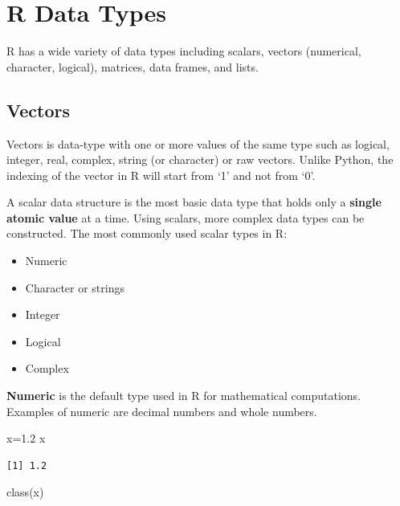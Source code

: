 \documentclass[
  letterpaper,
  DIV=11,
  numbers=noendperiod]{scrreprt}
\newenvironment{Shaded}{\begin{snugshade}}{\end{snugshade}}
\newcommand{\FloatTok}[1]{\textcolor[rgb]{0.68,0.00,0.00}{#1}}
\newcommand{\FunctionTok}[1]{\textcolor[rgb]{0.28,0.35,0.67}{#1}}
\newcommand{\NormalTok}[1]{\textcolor[rgb]{0.00,0.23,0.31}{#1}}
\newcommand{\OtherTok}[1]{\textcolor[rgb]{0.00,0.23,0.31}{#1}}
\begin{document}
\hypertarget{r-data-types}{%
\section{R Data Types}\label{r-data-types}}

R has a wide variety of data types including scalars, vectors
(numerical, character, logical), matrices, data frames, and lists.

\hypertarget{vectors}{%
\subsection{Vectors}\label{vectors}}

Vectors is data-type with one or more values of the same type such as
logical, integer, real, complex, string (or character) or raw vectors.
Unlike Python, the indexing of the vector in R will start from `1' and
not from `0'.

A scalar data structure is the most basic data type that holds only a
\textbf{single atomic value} at a time. Using scalars, more complex data
types can be constructed. The most commonly used scalar types in R:

\begin{itemize}
\item
  Numeric
\item
  Character or strings
\item
  Integer
\item
  Logical
\item
  Complex
\end{itemize}

\textbf{Numeric} is the default type used in R for mathematical
computations. Examples of numeric are decimal numbers and whole numbers.

\begin{Shaded}
\begin{Highlighting}[]
\NormalTok{x}\OtherTok{=}\FloatTok{1.2}
\NormalTok{x}
\end{Highlighting}
\end{Shaded}

\begin{verbatim}
[1] 1.2
\end{verbatim}

\begin{Shaded}
\begin{Highlighting}[]
\FunctionTok{class}\NormalTok{(x)}
\end{Highlighting}
\end{Shaded}
\end{document}
